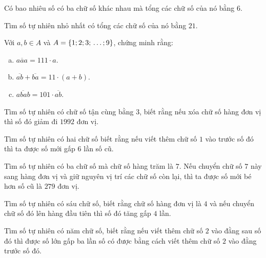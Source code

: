\begin{bt}
\begin{enumerate}[a)]
\end{enumerate}
\end{bt}   \begin{bt}
Có bao nhiêu số có ba chữ số khác nhau mà tổng các chữ số của nó bằng $6$.
\end{bt}   \begin{bt}
Tìm số tự nhiên nhỏ nhất có tổng các chữ số của nó bằng $21$.
\end{bt}   \begin{bt}
Với $a, b \in A$ và $A{\rm{ }} = \left\{ {1;{\rm{ }}2;{\rm{ }}3;{\rm{ }} \ldots ;{\rm{ }}9} \right\}$, chứng minh rằng:
\begin{enumerate}[a)]
\item $\overline{aaa}=111\cdot a$.
\item $\overline{ab}+\overline{ba}=11\cdot (a+b)$.
\item $\overline{abab}=101\cdot \overline{ab}$.
\end{enumerate}
\end{bt}   \begin{bt} 
Tìm số tự nhiên có chữ số tận cùng bằng $3$, biết rằng nếu xóa chữ số hàng đơn vị thì số đó giảm đi $1992$ đơn vị.
\end{bt}   \begin{bt}
Tìm số tự nhiên có hai chữ số biết rằng nếu viết thêm chữ số $1$ vào trước số đó thì ta được số mới gấp $6$ lần số cũ.
\end{bt}   \begin{bt}
Tìm số tự nhiên có ba chữ số mà chữ số hàng trăm là $7$. Nếu chuyển chữ số $7$ này sang hàng đơn vị và giữ nguyên vị trí các chữ số còn lại, thì ta được số mới bé hơn số cũ là $279$ đơn vị.
\end{bt}   \begin{bt}
Tìm số tự nhiên có sáu chữ số, biết rằng chữ số hàng đơn vị là $4$ và nếu chuyển chữ số đó lên hàng đầu tiên thì số đó tăng gấp $4$ lần.
\end{bt}   \begin{bt}
Tìm số tự nhiên có năm chữ số, biết rằng nếu viết thêm chữ số $2$ vào đằng sau số đó thì được số lớn gấp ba lần số có được bằng cách viết thêm chữ số $2$ vào đằng trước số đó.
\end{bt}